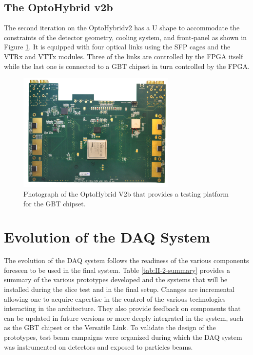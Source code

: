     \subsection{The OptoHybrid v2b}

      The second iteration on the OptoHybridv2 has a U shape to accommodate the constraints of the detector geometry, cooling system, and front-panel as shown in Figure \ref{fig:II-2-ohv2b}. It is equipped with four optical links using the SFP cages and the VTRx and VTTx modules. Three of the links are controlled by the FPGA itself while the last one is connected to a GBT chipset in turn controlled by the FPGA.

      \begin{figure}[t!]
        \centering
        \includegraphics[width=0.7\textwidth]{img/II-2-daq/oh-v2b.jpg}
        \caption{Photograph of the OptoHybrid V2b that provides a testing platform for the GBT chipset.}
        \label{fig:II-2-ohv2b}
      \end{figure}

  \section{Evolution of the DAQ System}

    The evolution of the DAQ system follows the readiness of the various components foreseen to be used in the final system. Table \ref{tab:II-2-summary} provides a summary of the various prototypes developed and the systems that will be installed during the slice test and in the final setup. Changes are incremental allowing one to acquire expertise in the control of the various technologies interacting in the architecture. They also provide feedback on components that can be updated in future versions or more deeply integrated in the system, such as the GBT chipset or the Versatile Link. To validate the design of the prototypes, test beam campaigns were organized during which the DAQ system was instrumented on detectors and exposed to particles beams.

